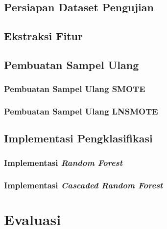 \documentclass[12pt,a4paper,titlepage]{report}
\begin{document}
	\section{Persiapan Dataset Pengujian}
	\label{bab:03:persiapan_data_pengujian}
	

	\section{Ekstraksi Fitur}
	\label{bab:03:ekstraksi_fitur}
	

	\section{Pembuatan Sampel Ulang}
	\label{bab:03:pembuatan_sampel_ulang}
	

	\subsection{Pembuatan Sampel Ulang SMOTE}
	\label{bab:03:sampel_ulang_smote}
	

	\subsection{Pembuatan Sampel Ulang LNSMOTE}
	\label{bab:03:sampel_ulang_lnsmote}
	

	\section{Implementasi Pengklasifikasi}
	

	\subsection{Implementasi \textit{Random Forest}}
	\label{subsection:implementasi_rf}
	

	\subsection{Implementasi \textit{Cascaded Random Forest}}
	\label{subsection:implementasi_crf}
	

\chapter{Evaluasi}
\label{bab:04}

\end{document}
